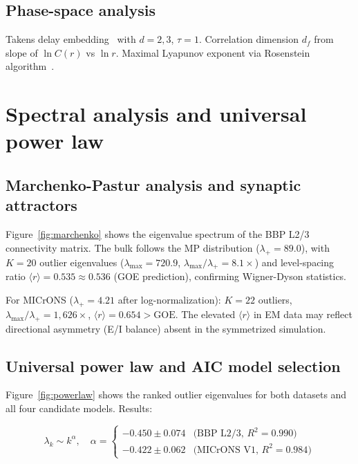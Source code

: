 \documentclass[aps,pre,twocolumn,showpacs,superscriptaddress,longbibliography]{revtex4-2}
\newcommand{\lp}{\lambda_{+}}
\newcommand{\lmax}{\lambda_{\max}}
\newcommand{\rGOE}{\langle r \rangle}
\begin{document}
\subsection{Phase-space analysis}

Takens delay embedding~\cite{Takens1981} with $d=2,3$, $\tau=1$.
Correlation dimension $d_f$ from slope of $\ln C(r)$ vs $\ln r$.
Maximal Lyapunov exponent via Rosenstein algorithm~\cite{Rosenstein1993}.

\section{\label{sec:rmt}Spectral analysis and universal power law}

\subsection{Marchenko-Pastur analysis and synaptic attractors}

Figure~\ref{fig:marchenko} shows the eigenvalue spectrum of the
BBP L2/3 connectivity matrix. The bulk follows the MP distribution
($\lp = 89.0$), with $K = 20$ outlier eigenvalues
($\lmax = 720.9$, $\lmax/\lp = 8.1\times$) and level-spacing ratio
$\rGOE = 0.535 \approx 0.536$ (GOE prediction), confirming
Wigner-Dyson statistics.

For MICrONS ($\lp = 4.21$ after log-normalization): $K = 22$
outliers, $\lmax/\lp = 1{,}626\times$, $\rGOE = 0.654 > \mathrm{GOE}$.
The elevated $\rGOE$ in EM data may reflect directional asymmetry
(E/I balance) absent in the symmetrized simulation.

\subsection{Universal power law and AIC model selection}

Figure~\ref{fig:powerlaw} shows the ranked outlier eigenvalues
for both datasets and all four candidate models. Results:

\begin{equation}
  \lambda_k \sim k^\alpha, \quad \alpha = \begin{cases}
    -0.450 \pm 0.074 & \text{(BBP L2/3, }R^2=0.990\text{)} \\
    -0.422 \pm 0.062 & \text{(MICrONS V1, }R^2=0.984\text{)}
  \end{cases}
  \label{eq:alpha}
\end{equation}
\end{document}
